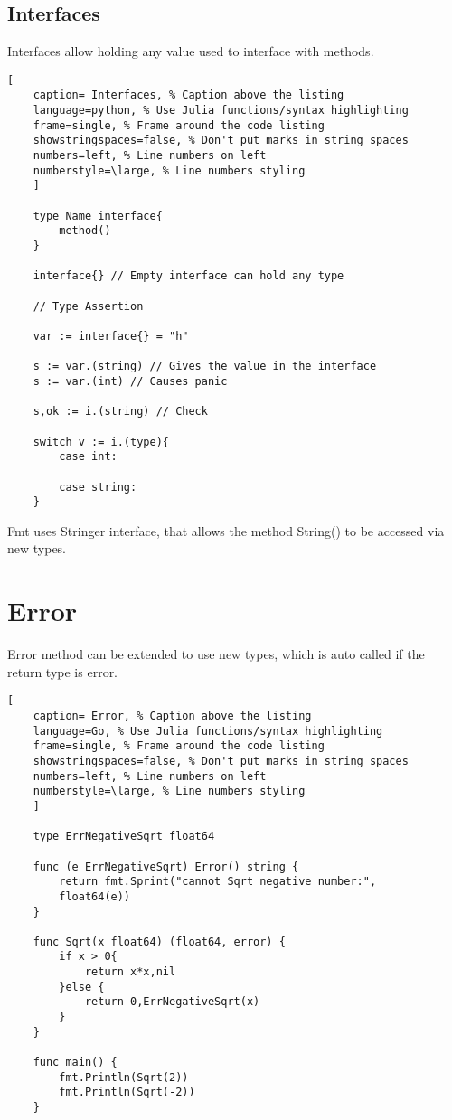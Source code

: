 \documentclass[11pt]{scrartcl} %
\begin{document}
\subsection{Interfaces}

Interfaces allow holding any value used to interface with methods.

\begin{lstlisting}[
	caption= Interfaces, % Caption above the listing
	language=python, % Use Julia functions/syntax highlighting
	frame=single, % Frame around the code listing
	showstringspaces=false, % Don't put marks in string spaces
	numbers=left, % Line numbers on left
	numberstyle=\large, % Line numbers styling
	]

	type Name interface{
		method()
	}

	interface{} // Empty interface can hold any type

	// Type Assertion

	var := interface{} = "h"

	s := var.(string) // Gives the value in the interface
	s := var.(int) // Causes panic

	s,ok := i.(string) // Check

	switch v := i.(type){
		case int:

		case string:
	}

\end{lstlisting}

Fmt uses Stringer interface, that allows the method String() to be accessed via new types.

\section{Error}

Error method can be extended to use new types, which is auto called if the return type is error.

\begin{lstlisting}[
	caption= Error, % Caption above the listing
	language=Go, % Use Julia functions/syntax highlighting
	frame=single, % Frame around the code listing
	showstringspaces=false, % Don't put marks in string spaces
	numbers=left, % Line numbers on left
	numberstyle=\large, % Line numbers styling
	]

	type ErrNegativeSqrt float64

	func (e ErrNegativeSqrt) Error() string {
		return fmt.Sprint("cannot Sqrt negative number:",
		float64(e))
	}

	func Sqrt(x float64) (float64, error) {
		if x > 0{
			return x*x,nil
		}else {
			return 0,ErrNegativeSqrt(x)
		}
	}

	func main() {
		fmt.Println(Sqrt(2))
		fmt.Println(Sqrt(-2))
	}

\end{lstlisting}
\end{document}
